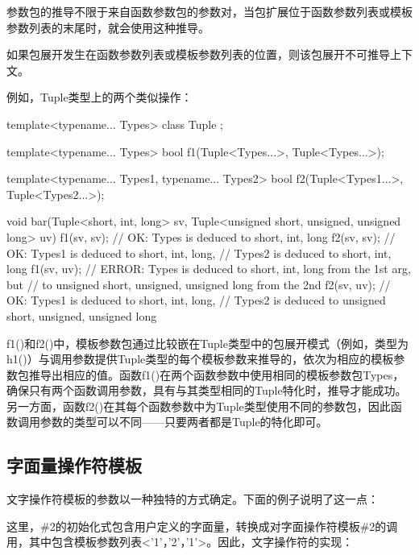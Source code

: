 参数包的推导不限于来自函数参数包的参数对，当包扩展位于函数参数列表或模板参数列表的末尾时，就会使用这种推导。

\begin{notice}
如果包展开发生在函数参数列表或模板参数列表的位置，则该包展开不可推导上下文。
\end{notice}

例如，Tuple类型上的两个类似操作：

\begin{cpp}
template<typename... Types> class Tuple { };

template<typename... Types>
bool f1(Tuple<Types...>, Tuple<Types...>);

template<typename... Types1, typename... Types2>
bool f2(Tuple<Types1...>, Tuple<Types2...>);

void bar(Tuple<short, int, long> sv,
		Tuple<unsigned short, unsigned, unsigned long> uv) {
	f1(sv, sv); // OK: Types is deduced to {short, int, long}
	f2(sv, sv); // OK: Types1 is deduced to {short, int, long},
				// Types2 is deduced to {short, int, long}
	f1(sv, uv); // ERROR: Types is deduced to {short, int, long} from the 1st arg, but
				// to {unsigned short, unsigned, unsigned long} from the 2nd
	f2(sv, uv); // OK: Types1 is deduced to {short, int, long},
				// Types2 is deduced to {unsigned short, unsigned, unsigned long}
}
\end{cpp}

f1()和f2()中，模板参数包通过比较嵌在Tuple类型中的包展开模式（例如，类型为h1()）与调用参数提供Tuple类型的每个模板参数来推导的，依次为相应的模板参数包推导出相应的值。函数f1()在两个函数参数中使用相同的模板参数包Types，确保只有两个函数调用参数，具有与其类型相同的Tuple特化时，推导才能成功。另一方面，函数f2()在其每个函数参数中为Tuple类型使用不同的参数包，因此函数调用参数的类型可以不同——只要两者都是Tuple的特化即可。

\subsection{字面量操作符模板}

文字操作符模板的参数以一种独特的方式确定。下面的例子说明了这一点：


这里，\#2的初始化式包含用户定义的字面量，转换成对字面操作符模板\#2的调用，其中包含模板参数列表<'1'，'2'，'1'>。因此，文字操作符的实现：

